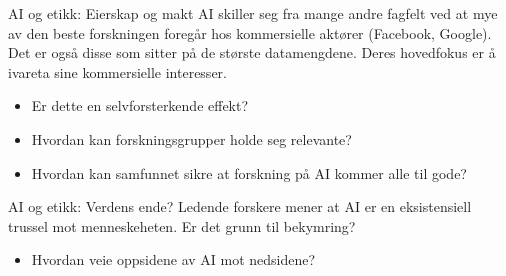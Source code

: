 \documentclass[8pt]{beamer}
\begin{document}
	\begin{frame}{AI og etikk: Eierskap og makt}
		AI skiller seg fra mange andre fagfelt ved at mye av den beste forskningen foregår hos kommersielle aktører (Facebook, Google). Det er også disse som sitter på de største datamengdene. Deres hovedfokus er å ivareta sine kommersielle interesser.
		\begin{itemize}
			\item Er dette en selvforsterkende effekt?
			\item Hvordan kan forskningsgrupper holde seg relevante?
			\item Hvordan kan samfunnet sikre at forskning på AI kommer alle til gode?
		\end{itemize}
	\end{frame}

	\begin{frame}{AI og etikk: Verdens ende?}
		Ledende forskere mener at AI er en eksistensiell trussel mot menneskeheten. Er det grunn til bekymring?
		\begin{itemize}
			\item Hvordan veie oppsidene av AI mot nedsidene?
		\end{itemize}
	\end{frame}
\end{document}
